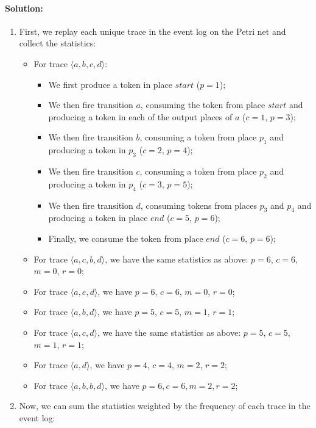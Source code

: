 \paragraph{Solution:}
\begin{enumerate}
    \item First, we replay each unique trace in the event log on the Petri net and collect the statistics:
    \begin{itemize}
        \item For trace $\langle a,b,c,d \rangle$:
        \begin{itemize}
            \item We first produce a token in place $start$ ($p=1$);
            \item We then fire transition $a$, consuming the token from place $start$ and producing a token in each of the output places of $a$ ($c=1$, $p=3$);
            \item We then fire transition $b$, consuming a token from place $p_1$ and producing a token in $p_3$ ($c=2$, $p=4$);
            \item We then fire transition $c$, consuming a token from place $p_2$ and producing a token in $p_4$ ($c=3$, $p=5$);
            \item We then fire transition $d$, consuming tokens from places $p_3$ and $p_4$ and producing a token in place $end$ ($c=5$, $p=6$);
            \item Finally, we consume the token from place $end$ ($c=6$, $p=6$);
        \end{itemize}
        \item For trace $\langle a,c,b,d \rangle$, we have the same statistics as above: $p=6$, $c=6$, $m=0$, $r=0$;
        \item For trace $\langle a,e,d \rangle$, we have $p=6$, $c=6$, $m=0$, $r=0$;
        \item For trace $\langle a,b,d \rangle$, we have $p=5$, $c=5$, $m=1$, $r=1$;
        \item For trace $\langle a,c,d \rangle$, we have the same statistics as above: $p=5$, $c=5$, $m=1$, $r=1$;
        \item For trace $\langle a,d \rangle$, we have $p=4$, $c=4$, $m=2$, $r=2$;
        \item For trace $\langle a,b,b,d \rangle$, we have $p=6, c=6, m=2, r=2$;
    \end{itemize}
    \item Now, we can sum the statistics weighted by the frequency of each trace in the event log:

\end{enumerate}
